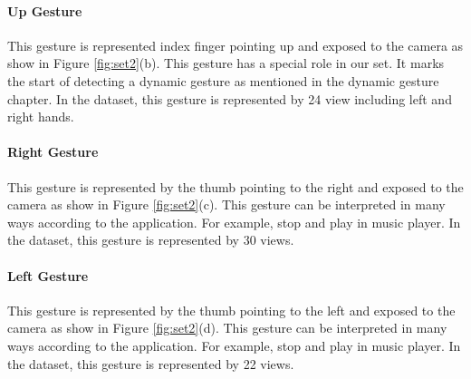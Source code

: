 \documentclass[12pt,fleqn]{book} %
\begin{document}
\paragraph{Up Gesture}
This gesture is represented index finger pointing up and exposed to the camera as show in Figure \ref{fig:set2}(b). This gesture has a special role in our set. It marks the start of detecting a dynamic gesture as mentioned in the dynamic gesture chapter. In the dataset, this gesture is represented by 24 view including left and right hands. 

\paragraph{Right Gesture}
This gesture is represented by the thumb pointing to the right and exposed to the camera as show in Figure \ref{fig:set2}(c). This gesture can be interpreted in many ways according to the application. For example, stop and play in music player. In the dataset, this gesture is represented by 30 views. 

\paragraph{Left Gesture}
This gesture is represented by the thumb pointing to the left and exposed to the camera as show in Figure \ref{fig:set2}(d). This gesture can be interpreted in many ways according to the application. For example, stop and play in music player. In the dataset, this gesture is represented by 22 views.
\end{document}
